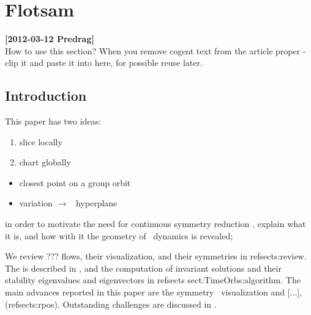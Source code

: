 
\section{Flotsam}
\label{s:flotsam}

\noindent
{\bf [2012-03-12 Predrag]}
\\
How to use this section? When you remove cogent text from the article
proper - clip  it and paste it into here, for possible reuse later.


\subsection{Introduction}
\label{s:introFlot}

This paper has two ideas:
\begin{enumerate}
  \item slice locally
  \item chart globally
\end{enumerate}

    \begin{itemize}
      \item closest point on a group orbit
      \item variation $\to$ \slice\ hyperplane
    \end{itemize}

    in order to motivate the need for continuous symmetry reduction , explain
    what it is, and how with it the geometry of \statesp\ dynamics is revealed;

We review  ??? flows, their visualization, and their symmetries in
refsect{s:review}. The {\mslices}  is described in ,
and the computation of invariant solutions and their stability
eigenvalues and eigenvectors in refsects {sect:TimeOrb}{s:algorithm}.
The main advances reported in this paper are the symmetry \reducedsp\
visualization and [...], (refsect{s:rpos}). Outstanding challenges are
discussed in \refsect{s:concl}.


